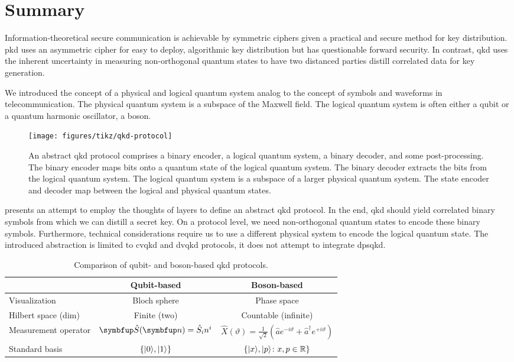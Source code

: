 \section*{Summary}

Information-theoretical secure communication is achievable by symmetric ciphers given a practical and secure method for key distribution.
\Gls{pkd} uses an asymmetric cipher for easy to deploy, algorithmic key distribution but has questionable forward security.
In contrast, \gls{qkd} uses the inherent uncertainty in measuring non-orthogonal quantum states to have two distanced parties distill correlated data for key generation.

We introduced the concept of a physical and logical quantum system analog to the concept of symbols and waveforms in telecommunication.
The physical quantum system is a subspace of the Maxwell field.
The logical quantum system is often either a qubit or a quantum harmonic oscillator, a boson.
\begin{figure}[htb]
	\centering
	\texttt{[image: figures/tikz/qkd-protocol]}
	\caption{An abstract \gls{qkd} protocol comprises a binary encoder, a logical quantum system, a binary decoder, and some post-processing. The binary encoder maps bits onto a quantum state of the logical quantum system. The binary decoder extracts the bits from the logical quantum system. The logical quantum system is a subspace of a larger physical quantum system. The state encoder and decoder map between the logical and physical quantum states.}\label{fig:qkd_protocol}
\end{figure}
 presents an attempt to employ the thoughts of layers to define an abstract \gls{qkd} protocol.
In the end, \gls{qkd} should yield correlated binary symbols from which we can distill a secret key.
On a protocol level, we need non-orthogonal quantum states to encode these binary symbols.
Furthermore, technical considerations require us to use a different physical system to encode the logical quantum state.
The introduced abstraction is limited to \gls{cvqkd} and \gls{dvqkd} protocols, it does not attempt to integrate \gls{dpsqkd}.
\begin{table}[htb]
	\centering	
	\begin{tabular}{lcc}
		\toprule
			& Qubit-based & Boson-based \\
		\midrule
			Visualization & Bloch sphere & Phase space \\
			Hilbert space (dim) & Finite (two) & Countable (infinite) \\
			Measurement operator & $\vb{\hat{S}}(\vb{n})=\hat{S}_in^i$ & $\hat{X}(\vartheta)=\frac{1}{\sqrt{2}}\left(\hat{a}e^{-i\vartheta}+\hat{a}^\dagger e^{+i\vartheta}\right)$ \\
			Standard basis & $\left\{\lvert0\rangle,\lvert1\rangle\right\}$ & $\left\{\lvert x\rangle,\lvert p\rangle\colon x,p\in\mathbb{R}\right\}$ \\
		\bottomrule
	\end{tabular}
	\caption{Comparison of qubit- and boson-based \gls{qkd} protocols.}
\end{table}
